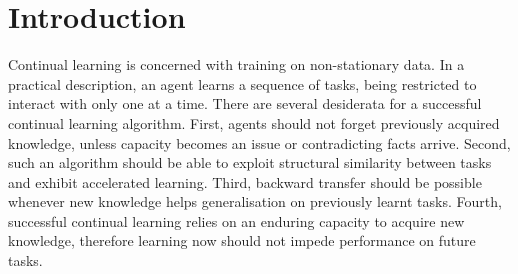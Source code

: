 \section{Introduction}
\label{sec:intro}

Continual learning is concerned with training on non-stationary data. In a practical description, an agent learns a sequence of tasks, being restricted to interact with only one at a time. There are several desiderata for a successful continual learning algorithm. First, agents should not forget previously acquired knowledge, unless capacity becomes an issue or contradicting facts arrive. Second, such an algorithm should be able to exploit structural similarity between tasks and exhibit accelerated learning. Third, backward transfer should be possible whenever new knowledge helps generalisation on previously learnt tasks. Fourth, successful continual learning relies on an enduring capacity to acquire new knowledge, therefore learning now should not impede performance on future tasks.


